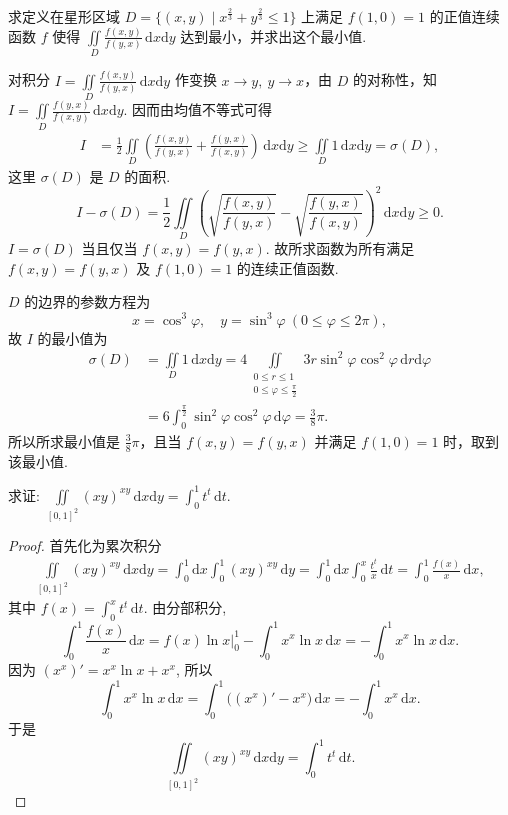 \documentclass[../../main.tex]{subfiles}
\begin{document}
\begin{example}
求定义在星形区域 $D = \{(x,y) \mid x^{\frac{2}{3}} + y^{\frac{2}{3}} \leqslant 1\}$ 上满足 $f(1,0) = 1$ 的正值连续函数 $f$ 使得 $\iint\limits_D \frac{f(x,y)}{f(y,x)} \,\mathrm{d}x\mathrm{d}y$ 达到最小，并求出这个最小值.
\end{example}
\begin{solution}
对积分 $I = \iint\limits_D \frac{f(x,y)}{f(y,x)} \,\mathrm{d}x\mathrm{d}y$ 作变换 $x \to y,\ y \to x$，由 $D$ 的对称性，知 $I = \iint\limits_D \frac{f(y,x)}{f(x,y)} \,\mathrm{d}x\mathrm{d}y$. 因而由均值不等式可得
\begin{align*}
I &= \frac{1}{2} \iint\limits_D \left( \frac{f(x,y)}{f(y,x)} + \frac{f(y,x)}{f(x,y)} \right) \,\mathrm{d}x\mathrm{d}y \geqslant \iint\limits_D 1 \,\mathrm{d}x\mathrm{d}y = \sigma(D),
\end{align*}
这里 $\sigma(D)$ 是 $D$ 的面积.
\[
I - \sigma(D) = \frac{1}{2} \iint\limits_D \left( \sqrt{\frac{f(x,y)}{f(y,x)}} - \sqrt{\frac{f(y,x)}{f(x,y)}} \right)^2 \,\mathrm{d}x\mathrm{d}y \geqslant 0.
\]
$I = \sigma(D)$ 当且仅当 $f(x,y) = f(y,x)$. 故所求函数为所有满足 $f(x,y) = f(y,x)$ 及 $f(1,0) = 1$ 的连续正值函数.

$D$ 的边界的参数方程为
\[
x = \cos^3 \varphi,\quad y = \sin^3 \varphi\ (0 \leqslant \varphi \leqslant 2\pi),
\]
故 $I$ 的最小值为
\begin{align*}
\sigma(D) &= \iint\limits_D 1 \,\mathrm{d}x\mathrm{d}y = 4 \iint\limits_{\substack{0 \leqslant r \leqslant 1 \\ 0 \leqslant \varphi \leqslant \frac{\pi}{2}}} 3r \sin^2 \varphi \cos^2 \varphi \,\mathrm{d}r\mathrm{d}\varphi \\
&= 6 \int_0^{\frac{\pi}{2}} \sin^2 \varphi \cos^2 \varphi \,\mathrm{d}\varphi = \frac{3}{8}\pi.
\end{align*}
所以所求最小值是 $\frac{3}{8}\pi$，且当 $f(x,y) = f(y,x)$ 并满足 $f(1,0) = 1$ 时，取到该最小值.

\end{solution}

\begin{example}
求证: $\iint\limits_{[0,1]^2} (xy)^{xy} \, \mathrm{d}x\mathrm{d}y = \int_0^1 t^t \, \mathrm{d}t$.
\end{example}
\begin{proof}
首先化为累次积分
\begin{align*}
\iint\limits_{[0,1]^2} (xy)^{xy} \, \mathrm{d}x\mathrm{d}y = \int_0^1 \mathrm{d}x \int_0^1 (xy)^{xy} \, \mathrm{d}y = \int_0^1 \mathrm{d}x \int_0^x \frac{t^t}{x} \, \mathrm{d}t = \int_0^1 \frac{f(x)}{x} \, \mathrm{d}x,
\end{align*}
其中 $f(x) = \int_0^x t^t \, \mathrm{d}t$. 由分部积分,
\[
\int_0^1 \frac{f(x)}{x} \, \mathrm{d}x = f(x) \ln x \bigg|_0^1 - \int_0^1 x^x \ln x \, \mathrm{d}x = - \int_0^1 x^x \ln x \, \mathrm{d}x.
\]
因为 $(x^x)' = x^x \ln x + x^x$, 所以
\[
\int_0^1 x^x \ln x \, \mathrm{d}x = \int_0^1 \big( (x^x)' - x^x \big) \, \mathrm{d}x = - \int_0^1 x^x \, \mathrm{d}x.
\]
于是
\[
\iint\limits_{[0,1]^2} (xy)^{xy} \, \mathrm{d}x\mathrm{d}y = \int_0^1 t^t \, \mathrm{d}t.
\]

\end{proof}
\end{document}
